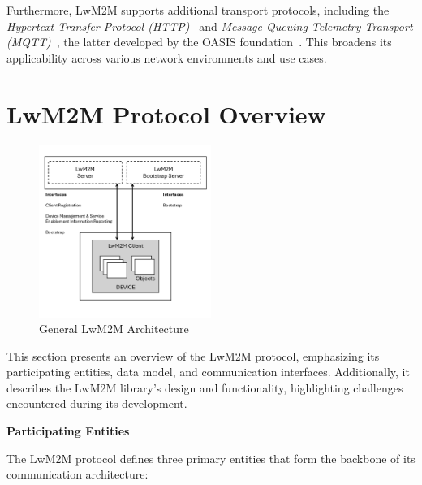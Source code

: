 \documentclass[11pt,sigconf]{iabart}
\begin{document}
Furthermore, LwM2M supports additional transport protocols, including the \textit{Hypertext Transfer Protocol (HTTP)}~\cite{http-spec} and \textit{Message Queuing Telemetry Transport (MQTT)}~\cite{mqtt-spec}, the latter developed by the OASIS foundation~\cite{oasis-foundation}. This broadens its applicability across various network environments and use cases.

\section{LwM2M Protocol Overview} \label{overview}

\begin{figure}[h]
  \centering
  \includegraphics[width=0.5\textwidth]{figs/arch.pdf}
  \caption{General LwM2M Architecture}
  \label{fig:overall_architecture}
\end{figure}

This section presents an overview of the LwM2M protocol, emphasizing its participating entities, data model, and communication interfaces. Additionally, it describes the LwM2M library's design and functionality, highlighting challenges encountered during its development.

\textbf{Participating Entities}

The LwM2M protocol defines three primary entities that form the backbone of its communication architecture:
\end{document}
